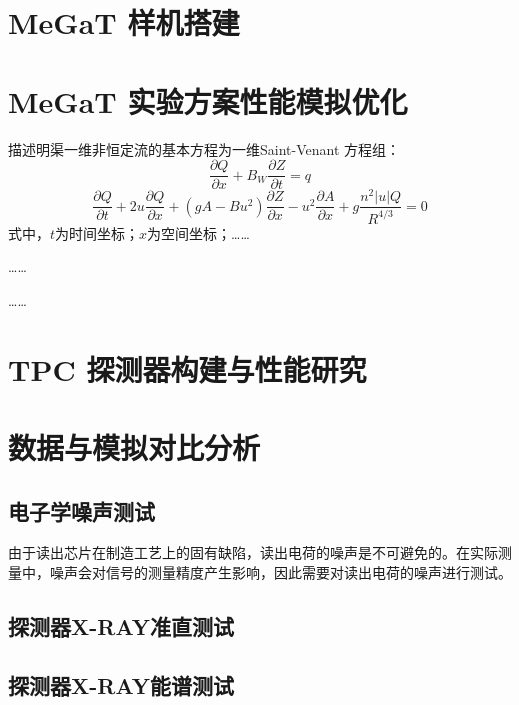 \section{MeGaT 样机搭建}

\section{MeGaT 实验方案性能模拟优化}


描述明渠一维非恒定流的基本方程为一维Saint-Venant 方程组：
\begin{equation}
	\frac{\partial Q}{\partial x}+B_{W}\frac{\partial Z}{\partial t}=q
\end{equation}
\begin{equation}
	\frac{\partial Q}{\partial t}+2u\frac{\partial Q}{\partial x}+(gA-Bu^{2})\frac{\partial Z}{\partial x}-u^{2}\frac{\partial A}{\partial x}+g\frac{n^{2} |u|Q}{R^{4/3}}=0
\end{equation}
\noindent 式中，$t$为时间坐标；$x$为空间坐标；……\par
……\par
……

\section{ TPC 探测器构建与性能研究}


\section{数据与模拟对比分析}
\subsection{电子学噪声测试}
由于读出芯片在制造工艺上的固有缺陷，读出电荷的噪声是不可避免的。在实际测量中，噪声会对信号的测量精度产生影响，因此需要对读出电荷的噪声进行测试。\par


\subsection{探测器X-RAY准直测试}


\subsection{探测器X-RAY能谱测试}


\subsection{}



